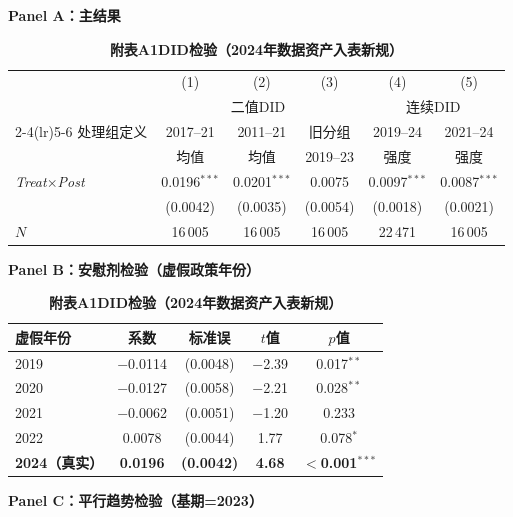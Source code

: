 \documentclass[11pt,a4paper]{article}
\newcommand{\hei}{\CJKfamily{hei}\bfseries}
\begin{document}
\FloatBarrier

\begin{table}[htbp]
\centering
\caption*{{\bf 附表A1\quad DID检验（2024年数据资产入表新规）}}
\label{tab:did}
\small

\vspace{4pt}
{\hei Panel A：主结果}
\vspace{4pt}

\begin{tabular}{l*{5}{c}}
\toprule
 & (1) & (2) & (3) & (4) & (5) \\
 & \multicolumn{3}{c}{二值DID} & \multicolumn{2}{c}{连续DID} \\
\cmidrule(lr){2-4}\cmidrule(lr){5-6}
处理组定义 & 2017--21 & 2011--21 & 旧分组 & 2019--24 & 2021--24 \\
 & 均值 & 均值 & 2019--23 & 强度 & 强度 \\
\midrule
\textit{Treat}$\times$\textit{Post}
 & 0.0196$^{***}$ & 0.0201$^{***}$ & 0.0075 & 0.0097$^{***}$ & 0.0087$^{***}$ \\
 & (0.0042) & (0.0035) & (0.0054) & (0.0018) & (0.0021) \\[4pt]
\midrule
$N$ & 16\,005 & 16\,005 & 16\,005 & 22\,471 & 16\,005 \\
\bottomrule
\end{tabular}

\vspace{14pt}
{\hei Panel B：安慰剂检验（虚假政策年份）}
\vspace{4pt}

\begin{tabular}{lcccc}
\toprule
虚假年份 & 系数 & 标准误 & $t$值 & $p$值 \\
\midrule
2019 & $-$0.0114 & (0.0048) & $-$2.39 & 0.017$^{**}$ \\
2020 & $-$0.0127 & (0.0058) & $-$2.21 & 0.028$^{**}$ \\
2021 & $-$0.0062 & (0.0051) & $-$1.20 & 0.233 \\
2022 & 0.0078 & (0.0044) & 1.77 & 0.078$^{*}$ \\
\textbf{2024（真实）} & \textbf{0.0196} & \textbf{(0.0042)} & \textbf{4.68} & $<$\textbf{0.001}$^{***}$ \\
\bottomrule
\end{tabular}

\vspace{14pt}
{\hei Panel C：平行趋势检验（基期=2023）}
\vspace{4pt}


\end{table}
\end{document}
